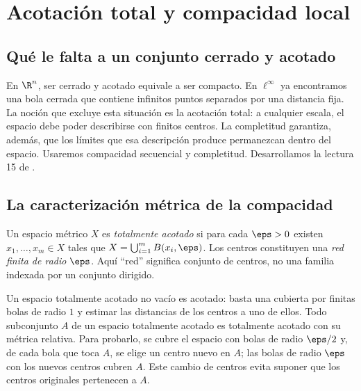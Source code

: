 \chapter{Acotación total y compacidad local}\label{chap:15}

\section{Qué le falta a un conjunto cerrado y acotado}
En $\R^n$, ser cerrado y acotado equivale a ser compacto. En $\ell^\infty$ ya encontramos una bola cerrada que contiene infinitos puntos separados por una distancia fija. La noción que excluye esta situación es la acotación total: a cualquier escala, el espacio debe poder describirse con finitos centros. La completitud garantiza, además, que los límites que esa descripción produce permanezcan dentro del espacio. Usaremos compacidad secuencial y completitud. Desarrollamos la lectura 15 de \cite{valencia}.

\section{La caracterización métrica de la compacidad}
\begin{definicion}
Un espacio métrico $X$ es \emph{totalmente acotado} si para cada $\eps>0$ existen $x_1,\ldots,x_m\in X$ tales que $X=\bigcup_{i=1}^mB(x_i,\eps)$. Los centros constituyen una \emph{red finita de radio $\eps$}. Aquí ``red'' significa conjunto de centros, no una familia indexada por un conjunto dirigido.
\end{definicion}
Un espacio totalmente acotado no vacío es acotado: basta una cubierta por finitas bolas de radio $1$ y estimar las distancias de los centros a uno de ellos. Todo subconjunto $A$ de un espacio totalmente acotado es totalmente acotado con su métrica relativa. Para probarlo, se cubre el espacio con bolas de radio $\eps/2$ y, de cada bola que toca $A$, se elige un centro nuevo en $A$; las bolas de radio $\eps$ con los nuevos centros cubren $A$. Este cambio de centros evita suponer que los centros originales pertenecen a $A$.

